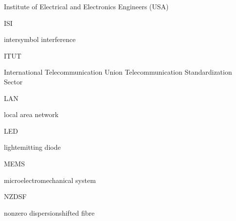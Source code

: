 \documentclass[letterpaper,10pt,english]{sphinxmanual}
\begin{document}
Institute of Electrical and Electronics Engineers (USA)









ISI





inter\sphinxhyphen{}symbol interference









ITU\sphinxhyphen{}T





International Telecommunication Union \textendash{} Telecommunication Standardization Sector









LAN





local area network









LED





light\sphinxhyphen{}emitting diode









MEMS





micro\sphinxhyphen{}electro\sphinxhyphen{}mechanical system









NZ\sphinxhyphen{}DSF





non\sphinxhyphen{}zero dispersion\sphinxhyphen{}shifted fibre
\end{document}
